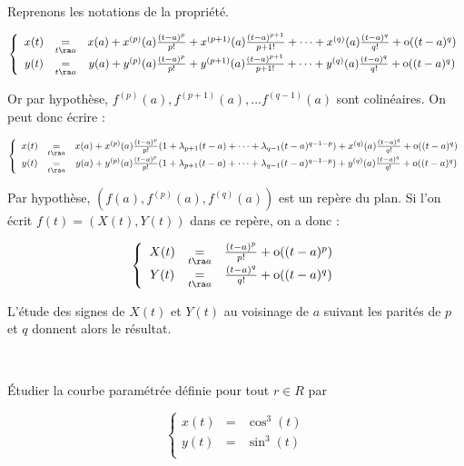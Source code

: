 \documentclass[12pt]{article}
\begin{document}
\begin{demo}~

Reprenons les notations de la propriété.

$$
\left\{
\begin{array}{ccc}
x(t)&\underset{t\ra
  a}{=}&x(a)+x^{(p)}(a)\frac{(t-a)^p}{p!}+x^{(p+1)}(a)\frac{(t-a)^{p+1}}{p+1!}+\dots +x^{(q)}(a)\frac{(t-a)^q}{q!}+\text{o}((t-a)^q)\\
y(t)&\underset{t\ra
  a}{=}&y(a)+y^{(p)}(a)\frac{(t-a)^p}{p!}+y^{(p+1)}(a)\frac{(t-a)^{p+1}}{p+1!}+\dots +y^{(q)}(a)\frac{(t-a)^q}{q!}+\text{o}((t-a)^q)\\
\end{array}
\right.
$$

Or par hypothèse, $f^{(p)}(a), f^{(p+1)}(a), \dots f^{(q-1)}(a)$ sont
colinéaires. On peut donc écrire :

$$
\left\{
\begin{array}{ccc}
x(t)&\underset{t\ra
  a}{=}&x(a)+x^{(p)}(a)\frac{(t-a)^p}{p!}(1+\lambda_{p+1}(t-a)+\dots+\lambda_{q-1}(t-a)^{q-1-p}) +x^{(q)}(a)\frac{(t-a)^q}{q!}+\text{o}((t-a)^q)\\
y(t)&\underset{t\ra
  a}{=}&y(a)+y^{(p)}(a)\frac{(t-a)^p}{p!}(1+\lambda_{p+1}(t-a)+\dots+\lambda_{q-1}(t-a)^{q-1-p}) +y^{(q)}(a)\frac{(t-a)^q}{q!}+\text{o}((t-a)^q)\\
\end{array}
\right.
$$


Par hypothèse, $(f(a), f^{(p)}(a), f^{(q)}(a))$ est un repère du plan. Si l'on écrit
$f(t)=(X(t), Y(t)) $ dans ce repère, on a donc :

$$
\left\{
\begin{array}{ccc}
X(t)&\underset{t\ra
  a}{=}&\frac{(t-a)^p}{p!}+\text{o}((t-a)^p)\\
Y(t)&\underset{t\ra
  a}{=}&\frac{(t-a)^q}{q!}+\text{o}((t-a)^q)\\
\end{array}
\right.
$$

L'étude des signes de $X(t)$ et $Y(t)$ au voisinage de $a$ suivant les
parités de $p$ et $q$ donnent alors le résultat.
\end{demo}


\begin{Ex}~

\'Etudier la courbe param\'etr\'ee d\'efinie pour tout $r\in R$ par

$$
\left\{ \begin{array}{rcl}
x(t)&=&\cos^3(t)\\
y(t)&=&\sin^3(t)\\
\end{array}\right.
$$

\end{Ex}
\end{document}
